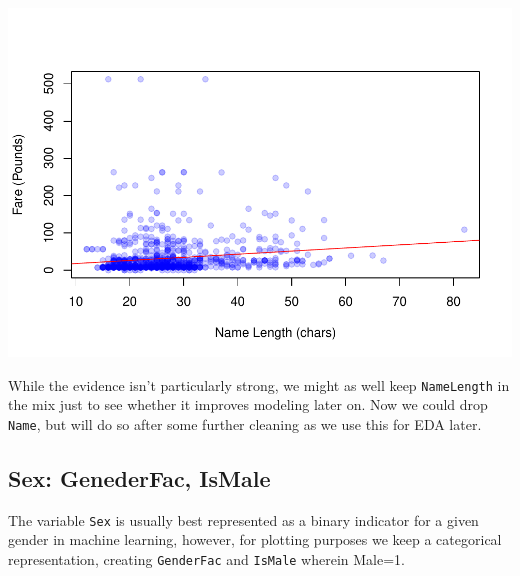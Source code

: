 \documentclass[]{article}
\newenvironment{Shaded}{\begin{snugshade}}{\end{snugshade}}
\newcommand{\KeywordTok}[1]{\textcolor[rgb]{0.13,0.29,0.53}{\textbf{#1}}}
\newcommand{\DecValTok}[1]{\textcolor[rgb]{0.00,0.00,0.81}{#1}}
\newcommand{\StringTok}[1]{\textcolor[rgb]{0.31,0.60,0.02}{#1}}
\newcommand{\CommentTok}[1]{\textcolor[rgb]{0.56,0.35,0.01}{\textit{#1}}}
\newcommand{\OtherTok}[1]{\textcolor[rgb]{0.56,0.35,0.01}{#1}}
\newcommand{\OperatorTok}[1]{\textcolor[rgb]{0.81,0.36,0.00}{\textbf{#1}}}
\newcommand{\NormalTok}[1]{#1}
\begin{document}
\includegraphics{Titanic_Survival_files/figure-latex/unnamed-chunk-10-1.pdf}

While the evidence isn't particularly strong, we might as well keep
\texttt{NameLength} in the mix just to see whether it improves modeling
later on. Now we could drop \texttt{Name}, but will do so after some
further cleaning as we use this for EDA later.

\subsection{Sex: GenederFac, IsMale}\label{sex-genederfac-ismale}

The variable \texttt{Sex} is usually best represented as a binary
indicator for a given gender in machine learning, however, for plotting
purposes we keep a categorical representation, creating
\texttt{GenderFac} and \texttt{IsMale} wherein Male=1.

\begin{Shaded}
\end{Shaded}
\end{document}
